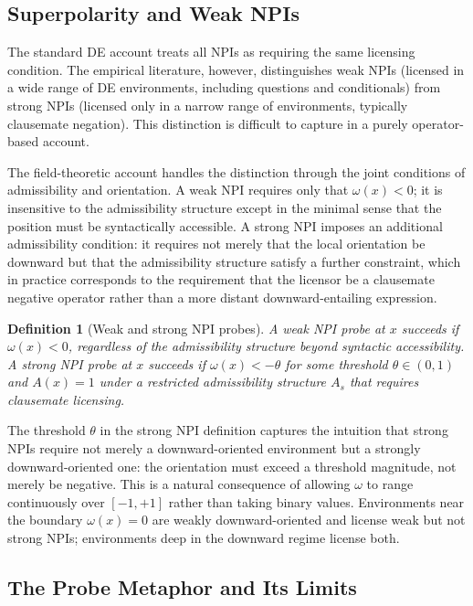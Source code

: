 \documentclass[12pt]{article}
\newtheorem{definition}[theorem]{Definition}
\theoremstyle{remark}
\begin{document}
\subsection{Superpolarity and Weak NPIs}

The standard DE account treats all NPIs as requiring the same licensing
condition. The empirical literature, however, distinguishes weak NPIs
(licensed in a wide range of DE environments, including questions and
conditionals) from strong NPIs (licensed only in a narrow range of
environments, typically clausemate negation). This distinction is
difficult to capture in a purely operator-based account.

The field-theoretic account handles the distinction through the joint
conditions of admissibility and orientation. A weak NPI requires only
that $\omega(x) < 0$; it is insensitive to the admissibility structure
except in the minimal sense that the position must be syntactically
accessible. A strong NPI imposes an additional admissibility condition:
it requires not merely that the local orientation be downward but that
the admissibility structure satisfy a further constraint, which in
practice corresponds to the requirement that the licensor be a clausemate
negative operator rather than a more distant downward-entailing
expression.

\begin{definition}[Weak and strong NPI probes]
A \emph{weak NPI probe} at $x$ succeeds if $\omega(x) < 0$, regardless
of the admissibility structure beyond syntactic accessibility. A
\emph{strong NPI probe} at $x$ succeeds if $\omega(x) < -\theta$ for
some threshold $\theta \in (0,1)$ and $A(x) = 1$ under a restricted
admissibility structure $A_s$ that requires clausemate licensing.
\end{definition}

The threshold $\theta$ in the strong NPI definition captures the
intuition that strong NPIs require not merely a downward-oriented
environment but a strongly downward-oriented one: the orientation must
exceed a threshold magnitude, not merely be negative. This is a natural
consequence of allowing $\omega$ to range continuously over $[-1,+1]$
rather than taking binary values. Environments near the boundary
$\omega(x) = 0$ are weakly downward-oriented and license weak but not
strong NPIs; environments deep in the downward regime license both.

\subsection{The Probe Metaphor and Its Limits}
\end{document}
